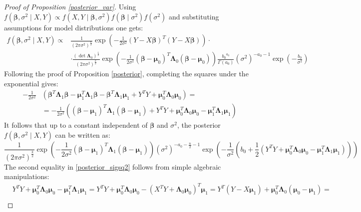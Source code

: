 \documentclass[10pt,fleqn]{amsart}
\theoremstyle{definition}
\theoremstyle{remark}
\numberwithin{equation}{section}
\newcommand{\bbeta}{\boldsymbol{\beta}}
\newcommand{\mmu}{\boldsymbol{\mu}}
\newcommand{\LLambda}{\boldsymbol{\Lambda}}
\newcommand{\XTY}{X^TY}
\newcommand{\YTY}{Y^TY}
\begin{document}
\begin{proof}[Proof of Proposition \ref{posterior_var}]
Using $f(\bbeta, \sigma^2\mid X, Y)\propto f(X, Y\mid \bbeta, \sigma^2)f(\bbeta\mid\sigma^2)f(\sigma^2)$ and
substituting assumptions for model distributions one gets:
\begin{equation}\label{posterior_var_pf1}\begin{split}
    f(\bbeta,\sigma^2\mid X, Y)\propto&\frac 1 {\left(2\pi\sigma^2\right)^{\frac n 2}}
    \exp\left(-\frac 1{2\sigma^2}\left(Y-X\bbeta\right)^T\left(Y-X\bbeta\right)\right)\cdot\\
    &\cdot\frac{\left(\det\LLambda_0\right)^{\frac 12}}{\left(2\pi\sigma^2\right)^{\frac{k}2}}
    \exp\left(-\frac 1{2\sigma^2}(\bbeta-\mmu_0)^T\LLambda_0(\bbeta-\mmu_0)\right)
    \frac{{b_0}^{a_0}}{\Gamma(a_0)}\left(\sigma^2\right)^{-a_0-1}\exp\left(-\frac{b_0}{\sigma^2}\right)
\end{split}\end{equation}
Following the proof of Proposition \ref{posterior}, completing the squares under the exponential gives:
\begin{equation*}\begin{split}
    -\frac 1{2\sigma^2}&\left(\bbeta^T\LLambda_1\bbeta-\mmu_1^T\LLambda_1\bbeta-\bbeta^T\LLambda_1\mmu_1+\YTY+\mmu_0^T\LLambda_0\mmu_0\right)=\\
    &=-\frac 1{2\sigma^2}\left((\bbeta-\mmu_1)^T\LLambda_1(\bbeta-\mmu_1)+\YTY+\mmu_0^T\LLambda_0\mmu_0-\mmu_1^T\LLambda_1\mmu_1\right)
\end{split}\end{equation*}
It follows that up to a constant independent of $\bbeta$ and $\sigma^2$, the posterior $f(\bbeta,\sigma^2\mid X, Y)$ can be written as:
\begin{equation*}
    \frac 1{\left(2\pi\sigma^2\right)^{\frac{k}2}}
    \exp\left(-\frac 1{2\sigma^2}(\bbeta-\mmu_1)^T\LLambda_1(\bbeta-\mmu_1)\right)
    \left(\sigma^2\right)^{-a_0-\frac n 2 -1}\exp\left(-\frac{1}{\sigma^2}\left(b_0+\frac 12 
    \left(\YTY+\mmu_0^T\LLambda_0\mmu_0-\mmu_1^T\LLambda_1\mmu_1\right)
    \right)\right)
\end{equation*}
The second equality in \ref{posterior_sigsq2} follows from simple algebraic manipulations:
\begin{equation*}\begin{split}
    &\YTY+\mmu_0^T\LLambda_0\mmu_0-\mmu_1^T\LLambda_1\mmu_1=
    \YTY+\mmu_0^T\LLambda_0\mmu_0-\left(\XTY+\LLambda_0\mmu_0\right)^T\mmu_1=
    Y^T\left(Y-X\mmu_1\right)+\mmu_0^T\LLambda_0\left(\mmu_0-\mmu_1\right)=\\

\end{split}
\end{equation*}
\end{proof}
\end{document}
